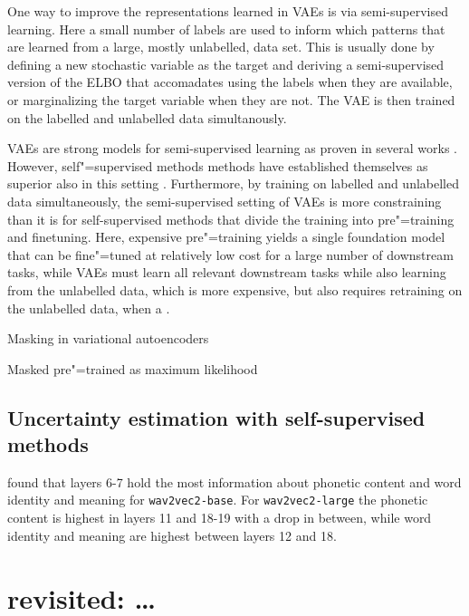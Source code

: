 One way to improve the representations learned in VAEs is via semi-supervised learning. 
Here a small number of labels are used to inform which patterns that are learned from a large, mostly unlabelled, data set. 
This is usually done by defining a new stochastic variable as the target and deriving a semi-supervised version of the ELBO that accomadates using the labels when they are available, or marginalizing the target variable when they are not. The VAE is then trained on the labelled and unlabelled data simultanously. 

VAEs are strong models for semi-supervised learning as proven in several works \parencite{kingma_semi-supervised_2014,kingma_improved_2016,maaloe_biva_2019}. 
However, self"=supervised methods methods have established themselves as superior also in this setting \cite{jiang_speech_2021, liu_learning_2023}. 
Furthermore, by training on labelled and unlabelled data simultaneously, the semi-supervised setting of VAEs is more constraining than it is for self-supervised methods that divide the training into pre"=training and finetuning. Here, expensive pre"=training yields a single foundation model that can be fine"=tuned at relatively low cost for a large number of downstream tasks, while VAEs must learn all relevant downstream tasks while also learning from the unlabelled data, which is more expensive, but also requires retraining on the unlabelled data, when a . 


Masking in variational autoencoders

Masked pre"=trained as maximum likelihood



\subsection{Uncertainty estimation with self-supervised methods}
%

\textcite{pasad_layerwise_2021} found that layers 6-7 hold the most information about phonetic content and word identity and meaning for \texttt{wav2vec2-base}. 
For \texttt{wav2vec2-large} the phonetic content is highest in layers 11 and 18-19 with a drop in between, while word identity and meaning are highest between layers 12 and 18. 







\section{ revisited: \dots}

